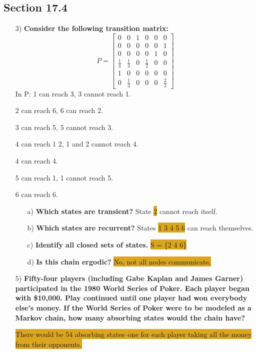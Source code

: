 \documentclass{article}
\begin{document}
\subsection*{Section 17.4}
\begin{enumerate}
\item[3) ] \textbf{Consider the following transition matrix:}
\[
P = 
\begin{bmatrix}
0 & 0 & 1 & 0 & 0 & 0\\
0 & 0 & 0 & 0 & 0 & 1\\
0 & 0 & 0 & 0 & 1 & 0\\
\frac{1}{4} & \frac{1}{4} & 0 & \frac{1}{2} & 0 & 0\\
1 & 0 & 0 & 0 & 0 & 0\\
0 & \frac{1}{3} & 0 & 0 & 0 & \frac{2}{3}
\end{bmatrix}
\]
In P: 1 can reach 3, 3 cannot reach 1. 

2 can reach 6, 6 can reach 2. 

3 can reach 5, 5 cannot reach 3. 

4 can reach 1 2, 1 and 2 cannot reach 4.

4 can reach 4. 

5 can reach 1, 1 cannot reach 5. 

6 can reach 6.  

\begin{enumerate}
\item[a) ] \textbf{Which states are transient?} State \colorbox{Goldenrod}{2} cannot reach itself.
\item[b) ] \textbf{Which states are recurrent?} States \colorbox{Goldenrod}{1 3 4 5 6} can reach themselves.
\item[c) ] \textbf{Identify all closed sets of states.} \colorbox{Goldenrod}{S = \{2 4 6\}}
\item[d) ] \textbf{Is this chain ergodic?} \colorbox{Goldenrod}{No, not all nodes communicate.}

\end{enumerate}
\item[5) ] \textbf{Fifty-four players (including Gabe Kaplan and James Garner) participated in the 1980 World Series of Poker. Each player began with \$10,000. Play continued until one player had won everybody else’s money. If the World Series of Poker were to be modeled as a Markov chain, how many absorbing states would the chain have?}

\colorbox{Goldenrod}{There would be 54 absorbing states--one for each player taking all the money from their opponents.}

\end{enumerate}
\end{document}
